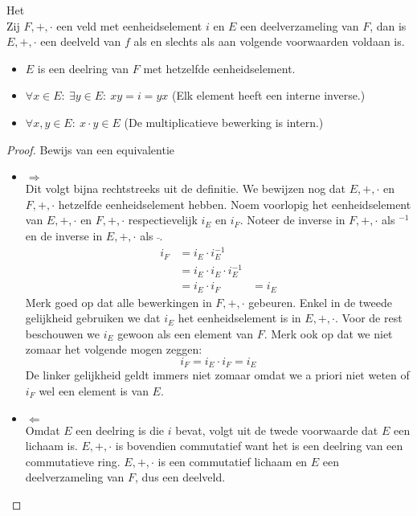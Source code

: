 \documentclass[main.tex]{subfiles}
\begin{document}
\begin{st}
  \label{st:criterium-deelveld}
  Het \\
  Zij $F,+,\cdot$ een veld met eenheidselement $i$ en $E$ een deelverzameling van $F$, dan is $E,+,\cdot$ een deelveld van $f$ als en slechts als aan volgende voorwaarden voldaan is.
  \begin{itemize}
  \item $E$ is een deelring van $F$ met hetzelfde eenheidselement.
  \item $\forall x\in E:\ \exists y\in E:\ xy =i = yx$ (Elk element heeft een interne inverse.)
  \item $\forall x,y\in E:\ x\cdot y \in E$ (De multiplicatieve bewerking is intern.)
  \end{itemize}

  \begin{proof}
    Bewijs van een equivalentie
    \begin{itemize}
    \item $\Rightarrow$\\
      Dit volgt bijna rechtstreeks uit de definitie.
      We bewijzen nog dat $E,+,\cdot$ en $F,+,\cdot$ hetzelfde eenheidselement hebben.
      Noem voorlopig het eenheidselement van $E,+,\cdot$ en $F,+,\cdot$ respectievelijk $i_{E}$ en $i_{F}$.
      Noteer de inverse in $F,+,\cdot$ als $^{-1}$ en de inverse in $E,+,\cdot$ als $\bar{}$.
      \[
      \begin{array}{rll}
        i_{F} &= i_{E}\cdot i_{E}^{-1} &\\
              &= i_{E} \cdot i_{E} \cdot i_{E}^{-1} &\\
              &= i_{E} \cdot i_{F} &= i_{E}
      \end{array}
      \]
      Merk goed op dat alle bewerkingen in $F,+,\cdot$ gebeuren.
      Enkel in de tweede gelijkheid gebruiken we dat $i_{E}$ het eenheidselement is in $E,+,\cdot$.
      Voor de rest beschouwen we $i_{E}$ gewoon als een element van $F$.
      Merk ook op dat we niet zomaar het volgende mogen zeggen:
      \[ i_{F} = i_{E} \cdot i_{F} = i_{E} \]
      De linker gelijkheid geldt immers niet zomaar omdat we a priori niet weten of $i_{F}$ wel een element is van $E$.
    \item $\Leftarrow$\\
      Omdat $E$ een deelring is die $i$ bevat, volgt uit de twede voorwaarde dat $E$ een lichaam is.
      $E,+,\cdot$ is bovendien commutatief want het is een deelring van een commutatieve ring. \needed
      $E,+,\cdot$ is een commutatief lichaam en $E$ een deelverzameling van $F$, dus een deelveld.
    \end{itemize}
  \end{proof}
\end{st}
\end{document}
